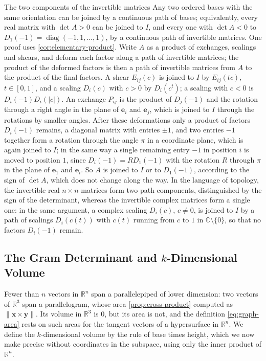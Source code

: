 \begin{note}{The two components of the invertible matrices}
Any two ordered bases with the same orientation can be joined by a continuous path of bases; equivalently, every real matrix with $\det A>0$ can be joined to $I$, and every one with $\det A<0$ to $D_1(-1)=\operatorname{diag}(-1,1,\ldots,1)$, by a continuous path of invertible matrices. One proof uses \cref{cor:elementary-product}. Write $A$ as a product of exchanges, scalings and shears, and deform each factor along a path of invertible matrices; the product of the deformed factors is then a path of invertible matrices from $A$ to the product of the final factors. A shear $E_{ij}(c)$ is joined to $I$ by $E_{ij}(tc)$, $t\in[0,1]$, and a scaling $D_i(c)$ with $c>0$ by $D_i(c^t)$; a scaling with $c<0$ is $D_i(-1)D_i(|c|)$. An exchange $P_{ij}$ is the product of $D_j(-1)$ and the rotation through a right angle in the plane of $\mathbf e_i$ and $\mathbf e_j$, which is joined to $I$ through the rotations by smaller angles. After these deformations only a product of factors $D_i(-1)$ remains, a diagonal matrix with entries $\pm1$, and two entries $-1$ together form a rotation through the angle $\pi$ in a coordinate plane, which is again joined to $I$; in the same way a single remaining entry $-1$ in position $i$ is moved to position $1$, since $D_i(-1)=RD_1(-1)$ with the rotation $R$ through $\pi$ in the plane of $\mathbf e_1$ and $\mathbf e_i$. So $A$ is joined to $I$ or to $D_1(-1)$, according to the sign of $\det A$, which does not change along the way. In the language of topology, the invertible real $n\times n$ matrices form two path components, distinguished by the sign of the determinant, whereas the invertible complex matrices form a single one: in the same argument, a complex scaling $D_i(c)$, $c\ne0$, is joined to $I$ by a path of scalings $D_i(c(t))$ with $c(t)$ running from $c$ to $1$ in $\mathbb C\setminus\{0\}$, so that no factors $D_i(-1)$ remain.
\end{note}

\subsection{The Gram Determinant and \texorpdfstring{$k$}{k}-Dimensional Volume}

Fewer than $n$ vectors in $\mathbb R^n$ span a parallelepiped of lower dimension: two vectors of $\mathbb R^3$ span a parallelogram, whose area \cref{prop:cross-product} computed as $\|\mathbf x\times\mathbf y\|$. Its volume in $\mathbb R^3$ is $0$, but its area is not, and the definition \eqref{eq:graph-area} rests on such areas for the tangent vectors of a hypersurface in $\mathbb R^n$. We define the $k$-dimensional volume by the rule of base times height, which we now make precise without coordinates in the subspace, using only the inner product of $\mathbb R^n$.

